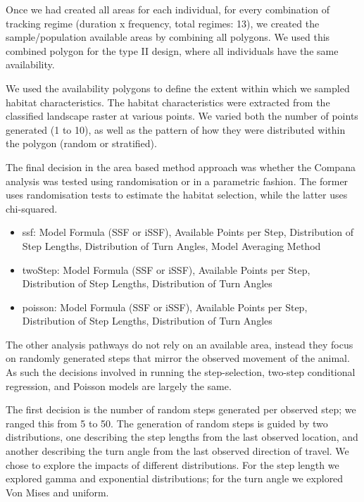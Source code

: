 \documentclass[10pt,a4paper]{article}
\providecommand{\tightlist}{%
  \setlength{\itemsep}{0pt}\setlength{\parskip}{0pt}}
\begin{document}
Once we had created all areas for each individual, for every combination of tracking regime (duration x frequency, total regimes: 13), we created the sample/population available areas by combining all polygons.
We used this combined polygon for the type II design, where all individuals have the same availability.

We used the availability polygons to define the extent within which we sampled habitat characteristics.
The habitat characteristics were extracted from the classified landscape raster at various points.
We varied both the number of points generated (1 to 10), as well as the pattern of how they were distributed within the polygon (random or stratified).

The final decision in the area based method approach was whether the Compana analysis was tested using randomisation or in a parametric fashion.
The former uses randomisation tests to estimate the habitat selection, while the latter uses chi-squared.

\begin{itemize}
\tightlist
\item
  ssf: Model Formula (SSF or iSSF), Available Points per Step, Distribution of Step Lengths, Distribution of Turn Angles, Model Averaging Method
\item
  twoStep: Model Formula (SSF or iSSF), Available Points per Step, Distribution of Step Lengths, Distribution of Turn Angles
\item
  poisson: Model Formula (SSF or iSSF), Available Points per Step, Distribution of Step Lengths, Distribution of Turn Angles
\end{itemize}

The other analysis pathways do not rely on an available area, instead they focus on randomly generated steps that mirror the observed movement of the animal.
As such the decisions involved in running the step-selection, two-step conditional regression, and Poisson models are largely the same.

The first decision is the number of random steps generated per observed step; we ranged this from 5 to 50.
The generation of random steps is guided by two distributions, one describing the step lengths from the last observed location, and another describing the turn angle from the last observed direction of travel.
We chose to explore the impacts of different distributions.
For the step length we explored gamma and exponential distributions; for the turn angle we explored Von Mises and uniform.
\end{document}
